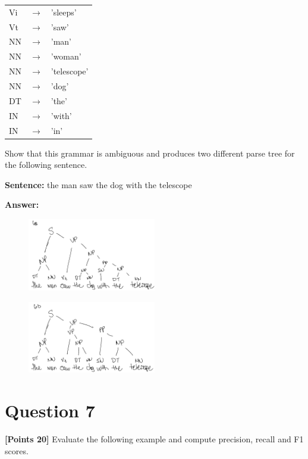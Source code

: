 \documentclass[12pt]{article}
\begin{document}
\begin{tabular}{|lll|}
      \hline
      Vi & $\rightarrow$ & 'sleeps'    \\
      Vt & $\rightarrow$ & 'saw'       \\
      \hline
      NN & $\rightarrow$ & 'man'       \\
      NN & $\rightarrow$ & 'woman'     \\
      NN & $\rightarrow$ & 'telescope' \\
      NN & $\rightarrow$ & 'dog'       \\
      \hline
      DT & $\rightarrow$ & 'the'       \\
      \hline
      IN & $\rightarrow$ & 'with'      \\
      IN & $\rightarrow$ & 'in'        \\
      \hline
\end{tabular}

Show that this grammar is ambiguous and produces two different parse
tree for the following sentence.

\textbf{Sentence:} the man saw the dog with the telescope

\textbf{Answer:}

\begin{figure}[!ht]
      \centering
      \includegraphics[width=0.5\textwidth]{assets/test2/p6a.png}
\end{figure}

\begin{figure}[!ht]
      \centering
      \includegraphics[width=0.5\textwidth]{assets/test2/p6b.png}
\end{figure}

\newpage
\section*{Question 7}
\textbf{[Points 20]} Evaluate the following example and compute precision,
recall and F1 scores.
\end{document}
